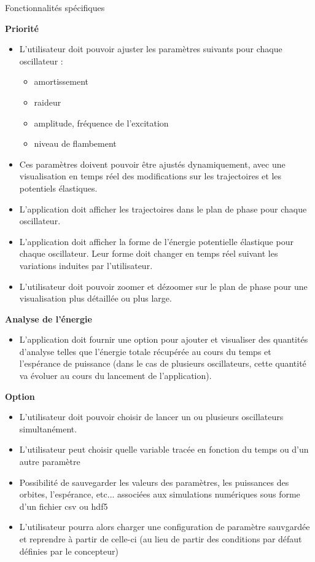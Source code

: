 \documentclass[a4paper, french, 12pt, titlepage]{article}
\begin{document}
\large{Fonctionnalités spécifiques}

\textbf{Priorité}
\begin{itemize}
  \item L'utilisateur doit pouvoir ajuster les paramètres suivants pour chaque oscillateur :
        \begin{itemize}
          \item amortissement
          \item raideur
          \item amplitude, fréquence de l'excitation
          \item niveau de flambement
        \end{itemize}
  \item Ces paramètres doivent pouvoir être ajustés dynamiquement, avec une visualisation en temps réel des modifications sur les trajectoires et les potentiels élastiques.
  \item L'application doit afficher les trajectoires dans le plan de phase pour chaque oscillateur.
  \item L'application doit afficher la forme de l'énergie potentielle élastique pour chaque oscillateur. Leur forme doit changer en temps réel suivant les variations induites par l'utilisateur.
  \item L'utilisateur doit pouvoir zoomer et dézoomer sur le plan de phase pour une visualisation plus détaillée ou plus large.
\end{itemize}


\textbf{Analyse de l'énergie}
\begin{itemize}
  \item L'application doit fournir une option pour ajouter et visualiser des quantités d'analyse telles que l'énergie totale récupérée au cours du temps et l'espérance de puissance (dans le cas de plusieurs oscillateurs, cette quantité va évoluer au cours du lancement de l'application).
\end{itemize}

\textbf{Option}
\begin{itemize}

  \item L'utilisateur doit pouvoir choisir de lancer un ou plusieurs oscillateurs simultanément.
  \item L'utilisateur peut choisir quelle variable tracée en fonction du temps ou d'un autre paramètre
  \item Possibilité de sauvegarder les valeurs des paramètres, les puissances des orbites, l'espérance, etc... associées aux simulations numériques sous forme d'un fichier csv ou hdf5
  \item L'utilisateur pourra alors charger une configuration de paramètre sauvgardée et reprendre à partir de celle-ci (au lieu de partir des conditions par défaut définies par le concepteur)

\end{itemize}
\end{document}
